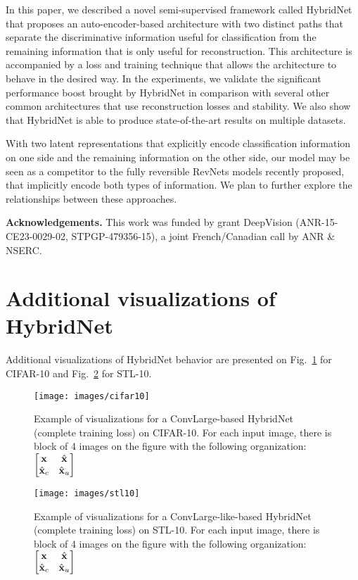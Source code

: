 \documentclass[runningheads]{llncs}
\begin{document}
In this paper, we described a novel semi-supervised framework called HybridNet that proposes an auto-encoder-based architecture with two distinct paths that  separate the discriminative information useful for classification from the remaining information that is only useful for reconstruction. This architecture is accompanied by a loss and training technique that allows the architecture to behave in the desired way. In the experiments, we validate the significant performance boost brought by HybridNet in comparison with several other common architectures that use reconstruction losses and stability. We also show that HybridNet is able to produce state-of-the-art results on multiple datasets.

With two latent representations that explicitly encode classification information on one side and the remaining information on the other side, our model may be seen as a competitor to the fully reversible RevNets models recently proposed, that implicitly encode both types of information.
We plan to further explore the relationships between these approaches.

\textbf{Acknowledgements.} This work was funded by grant DeepVision (ANR-15-CE23-0029-02, STPGP-479356-15), a joint French/Canadian call by ANR \& NSERC.





\newpage
\appendix


\section{Additional visualizations of HybridNet}

Additional visualizations of HybridNet behavior are presented on Fig.~\ref{fig:cifar10} for CIFAR-10 and Fig.~\ref{fig:stl10} for STL-10.

\begin{figure}
	\centering
    \texttt{[image: images/cifar10]}
    \caption[]{Example of visualizations for a ConvLarge-based HybridNet (complete training loss) on CIFAR-10. For each input image, there is block of 4 images on the figure with the following organization: $\begin{bmatrix}\mathbf{x}&\hat{\mathbf{x}}\\\hat{\mathbf{x}}_c&\hat{\mathbf{x}}_u\end{bmatrix}$}
    \label{fig:cifar10}
\end{figure}

\begin{figure}
	\centering
    \texttt{[image: images/stl10]}
    \caption[]{Example of visualizations for a ConvLarge-like-based HybridNet (complete training loss) on STL-10. For each input image, there is block of 4 images on the figure with the following organization: $\begin{bmatrix}\mathbf{x}&\hat{\mathbf{x}}\\\hat{\mathbf{x}}_c&\hat{\mathbf{x}}_u\end{bmatrix}$}
    \label{fig:stl10}
\end{figure}
\end{document}
